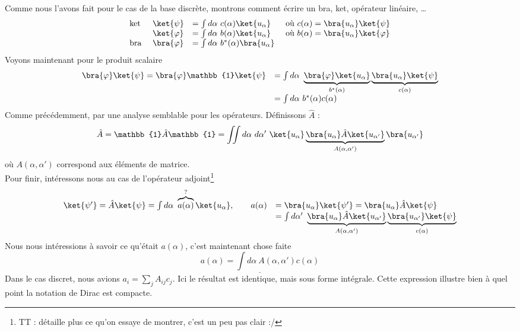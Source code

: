 Comme nous l'avons fait pour le cas de la base discrète, montrons comment écrire 
un bra, ket, opérateur linéaire, \dots
\begin{equation}
\begin{array}{llll}
\text{ket } & \ket{\psi} &= \int d\alpha\ c(\alpha)\ket{u_\alpha} & \text{ où } 
c(\alpha) = \bra{u_\alpha}\ket{\psi}\\
& \ket{\varphi} &= \int d\alpha\ b(\alpha)\ket{u_\alpha} & \text{ où } b(\alpha) 
= \bra{u_\alpha}\ket{\varphi}\\
\text{bra } & \bra{\varphi} &= \int d\alpha\ b^*(\alpha)\bra{u_\alpha}
\end{array}
\end{equation}
Voyons maintenant pour le produit scalaire
\begin{equation}
\begin{array}{ll}
\bra{\varphi}\ket{\psi} = \bra{\varphi}\mathbb{1}\ket{\psi} &= \int d\alpha\ 
\underbrace{\bra{\varphi}\ket{u_\alpha}}_{b^*(\alpha)}\underbrace{\bra{u_\alpha}
\ket{\psi}}_{c(\alpha)}\\
&= \int d\alpha\ b^*(\alpha)c(\alpha)
\end{array}
\end{equation}
Comme précédemment, par une analyse semblable pour les opérateurs. 
Définissons $\hat{A}$ :
\begin{equation}
\hat{A} = \mathbb{1}\hat{A}\mathbb{1} = \iint d\alpha\ d\alpha'\ \ket{u_\alpha}
\underbrace{\bra{u_\alpha}\hat{A}\ket{u_{\alpha'}}}_{A(\alpha,\alpha')}\bra{u_{\alpha'}}
\end{equation}
où $A(\alpha,\alpha')$ correspond aux éléments de matrice. \\
Pour finir, intéressons nous au cas de l'opérateur adjoint\footnote{TT : détaille plus 
ce qu'on essaye de montrer, c'est un peu pas clair :/}
\begin{equation}
\begin{array}{ll}
\ket{\psi'} = \hat{A}\ket{\psi} = \int d\alpha\ \overbrace{a(\alpha)}^{?}\ket{u_\alpha},
\qquad a(\alpha) &= \bra{u_\alpha}\ket{\psi'} = \bra{u_\alpha}\hat{A}\ket{\psi}\\
&= \int d\alpha'\ \underbrace{\bra{u_\alpha}\hat{A}\ket{u_{\alpha'}}}_{A(\alpha,
\alpha')}\underbrace{\bra{u_{\alpha'}}\ket{\psi}}_{c(\alpha)}
\end{array}
\end{equation}
Nous nous intéressions à savoir ce qu'était $a(\alpha)$, c'est maintenant chose faite
\begin{equation}
\underline{a(\alpha) = \int d\alpha\ A(\alpha,\alpha')c(\alpha)}
\end{equation}
Dans le cas discret, nous avions $a_i = \sum_j A_{ij}c_j$. Ici le résultat est identique, 
mais sous forme intégrale. Cette expression illustre bien à quel point la notation de 
Dirac est compacte.


